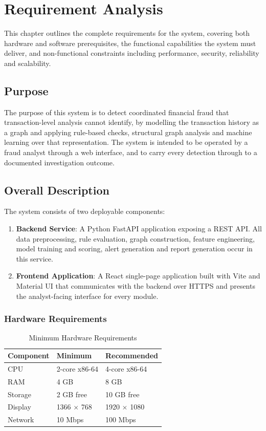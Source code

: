 \chapter{Requirement Analysis}

This chapter outlines the complete requirements for the system, covering both hardware and software prerequisites, the functional capabilities the system must deliver, and non-functional constraints including performance, security, reliability and scalability.

\section{Purpose}
The purpose of this system is to detect coordinated financial fraud that transaction-level analysis cannot identify, by modelling the transaction history as a graph and applying rule-based checks, structural graph analysis and machine learning over that representation. The system is intended to be operated by a fraud analyst through a web interface, and to carry every detection through to a documented investigation outcome.

\section{Overall Description}
The system consists of two deployable components:

\begin{enumerate}
  \item \textbf{Backend Service}: A Python FastAPI application exposing a REST API. All data preprocessing, rule evaluation, graph construction, feature engineering, model training and scoring, alert generation and report generation occur in this service.
  \item \textbf{Frontend Application}: A React single-page application built with Vite and Material UI that communicates with the backend over HTTPS and presents the analyst-facing interface for every module.
\end{enumerate}

\subsection{Hardware Requirements}
\begin{table}[H]
\centering
\caption{Minimum Hardware Requirements}
\label{tab:hardware}
\small
\begin{tabular}{lll}
\toprule
\textbf{Component} & \textbf{Minimum} & \textbf{Recommended} \\
\midrule
CPU     & 2-core x86-64 & 4-core x86-64 \\
RAM     & 4 GB          & 8 GB \\
Storage & 2 GB free     & 10 GB free \\
Display & 1366 $\times$ 768 & 1920 $\times$ 1080 \\
Network & 10 Mbps       & 100 Mbps \\
\bottomrule
\end{tabular}
\end{table}

